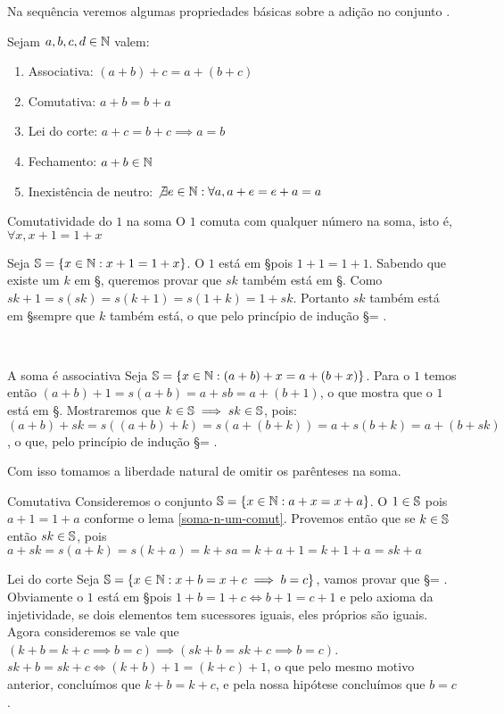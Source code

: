 \documentclass[../main.tex]{subfiles}
\begin{document}
Na sequência veremos algumas propriedades básicas sobre a adição no conjunto \N.
\begin{prop}{Sejam $a, b, c, d \in \N$ valem:}
    \begin{enumerate}[label=(\roman*)]
    	\item Associativa: $(a + b) + c = a + (b + c)$
    	\item Comutativa: $a + b =  b + a$
        \item Lei do corte: $a + c = b + c \implies a = b$
        \item Fechamento: $a + b \in \N$
    	\item Inexistência de neutro: $\not\exists e \in \N : \forall a, a + e = e + a = a$
    \end{enumerate}
\end{prop}
\begin{lema}{Comutatividade do $1$ na soma}\label{soma-n-um-comut}
    O $1$ comuta com qualquer número na soma, isto é,$ \forall x, x + 1 = 1 + x$
\end{lema}
\begin{dem}
    Seja $\S = \{ x \in \N : x + 1 = 1 + x\}$. O $1$ está em \S pois $1 + 1 = 1 + 1$.
    Sabendo que existe um $k$ em \S, queremos provar que $sk$ também está em \S. Como
    $sk + 1 = s(sk) = s(k+1) = s(1+k) = 1 + sk$. Portanto $sk$ também está em \S sempre que $k$ também está, o que pelo princípio de indução \S = \N.
\end{dem} \\
\begin{dem}{A soma é associativa}
     Seja $\S = \{ x \in \N : (a + b) + x = a + (b + x) \}$. Para o $1$ temos então
     $(a + b) + 1 = s(a + b) = a + sb = a + (b + 1)$, o que mostra que o $1$ está em \S. 
     Mostraremos que $k \in \S \implies sk \in \S$, pois:
     $(a + b) + sk = s( (a + b) + k) = s(a + (b + k)) = a + s(b + k) = a + (b + sk)$, o que, pelo princípio de indução \S = \N.
\end{dem}
\begin{obs}
    Com isso tomamos a liberdade natural de omitir os parênteses na soma.
\end{obs}
\begin{dem}{Comutativa}
    Consideremos o conjunto $\S = \{ x \in \N : a + x = x + a\}$. O $1 \in \S$ pois 
    $a + 1 = 1 + a$ conforme o lema \ref{soma-n-um-comut}.
    Provemos então que se $k \in \S$ então $sk \in \S$, pois 
    $a + sk = s(a + k) = s(k + a) = k + sa = k + a + 1 = k + 1 + a = sk + a$
\end{dem}
\begin{dem}{Lei do corte}
    Seja $\S = \{ x \in \N : x + b = x + c \implies b = c \}$, vamos provar que \S = \N. Obviamente o $1$ está em \S pois $1 + b = 1 + c \iff b + 1 = c + 1$ e pelo axioma da injetividade, se dois elementos tem sucessores iguais, eles próprios são iguais. Agora consideremos se vale que $(k + b = k + c \implies b = c) \implies (sk + b = sk + c \implies b = c)$. \\
    $sk + b = sk + c \iff (k + b) + 1 = (k + c) + 1$, o que pelo mesmo motivo anterior, concluímos que $k + b = k + c$, e pela nossa hipótese concluímos que $b = c$.
\end{dem}
\end{document}
